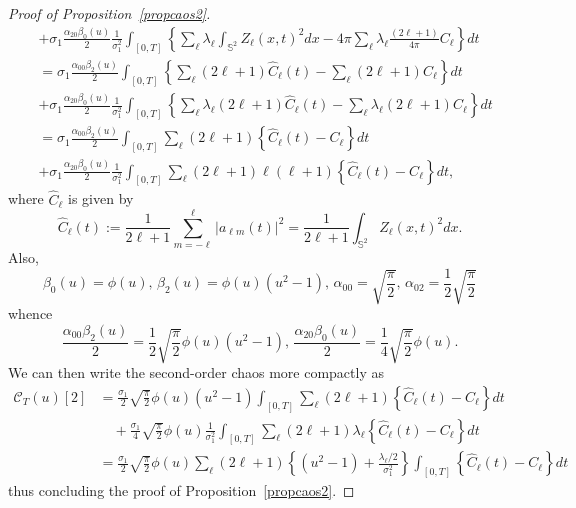 \documentclass[AHL,Unicode,longabstracts,published]{cedram}
\newcommand{\clC}{\mathcal{C}}
\newcommand{\bbS}{\mathbb{S}}
\begin{document}
\begin{proof}[{Proof of Proposition~\ref{propcaos2}}]
\begin{align*}
&+\sigma_1 \frac{\alpha _{20}\beta _{0}(u)}{2}\frac{1}{\sigma_1^2}
\int_{[0,T]}\left\{\sum_{\ell }\lambda _{\ell }\int_{\bbS^{2}}Z_{\ell }(x,t)^2 dx-4\pi \sum_{\ell } \lambda _{\ell } \frac{(2\ell +1)}{4\pi }C_{\ell } \right\} dt\\
&=\sigma_1 \frac{\alpha _{00}\beta _{2}(u)}{2}\int_{[0,T]}\left\{ \sum_{\ell}(2\ell+1)\widehat{C}_{\ell }(t)-\sum_{\ell}(2\ell +1)C_{\ell}\right\} dt
\\
&+\sigma_1 \frac{\alpha _{20}\beta _{0}(u)}{2}\frac{1}{\sigma_1^2}
\int_{[0,T]}\left\{ \sum_{\ell }\lambda _{\ell }(2\ell+1)\widehat{C}_{\ell }(t)- \sum_{\ell} \lambda _{\ell} (2\ell +1)C_{\ell} \right\} dt \\
&=\sigma_1 \frac{\alpha _{00}\beta _{2}(u)}{2}\int_{[0,T]}\sum_{\ell}(2\ell +1)\left\{ \widehat{C}_{\ell }(t)-C_\ell\right\} dt \\
&+\sigma_1 \frac{\alpha _{20}\beta _{0}(u)}{2}\frac{1}{\sigma_1^2}
\int_{[0,T]}\sum_{\ell }(2\ell +1)\ell (\ell +1)\left\{\widehat{C}_{\ell }(t)-C_\ell\right\}dt,
\end{align*}
\endgroup
where $\widehat{C}_{\ell }$ is given by
\begin{equation}\label{sampletris}
\widehat{C}_{\ell }(t):=\frac{1}{2\ell +1}\sum_{m=-\ell }^{\ell }\left\vert a_{\ell m}(t)\right\vert^{2}=\frac{1}{2\ell +1}\int_{\bbS^{2}}Z_{\ell}(x,t)^{2}dx\text{.}
\end{equation}
Also,
\begin{equation*}
\beta _{0}(u)=\phi (u)\text{, }\beta _{2}(u)=\phi (u)\left(u^{2}-1\right)\text{, }
\alpha _{00}=\sqrt{\frac{\pi }{2}}\text{, }\alpha _{02}=\frac{1}{2}\sqrt{
\frac{\pi }{2}}
\end{equation*}
whence
\begin{equation*}
\frac{\alpha _{00}\beta _{2}(u)}{2}=\frac{1}{2}\sqrt{\frac{\pi }{2}}\phi (u)\left(u^{2}-1\right)\text{, }\frac{\alpha _{20}\beta _{0}(u)}{2}=\frac{1}{4}\sqrt{
\frac{\pi }{2}}\phi (u)\text{.}
\end{equation*}
We can then write the second-order chaos more compactly as
\begin{align*}
\clC_T(u)[2] &= \frac{\sigma _{1}}{2}\sqrt{\frac{\pi }{2}}\phi (u)\left(u^{2}-1\right)\int_{[0,T]}\sum_{\ell }(2\ell +1)\left\{ \widehat{C}_{\ell }(t)-C_{\ell }\right\} dt \\
&\quad+\frac{\sigma _{1}}{4}\sqrt{\frac{\pi }{2}}\phi (u)\frac{1}{\sigma _{1}^{2} }\int_{[0,T]}\sum_{\ell }(2\ell +1)\lambda _{\ell }\left\{ \widehat{C}_{\ell }(t)-C_{\ell }\right\} dt \\
&= \frac{\sigma _{1}}{2}\sqrt{\frac{\pi }{2}}\phi (u)\sum_{\ell }(2\ell +1)\left\{\left(u^{2}-1\right)+\frac{\lambda _{\ell }/2}{\sigma _{1}^{2}}\right\}
\int_{[0,T]} \left\{\widehat{C}_{\ell }(t)-C_{\ell }\right\} dt
\end{align*}
thus concluding the proof of Proposition~\ref{propcaos2}.
\end{proof}
\end{document}
